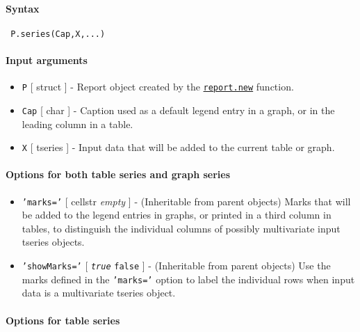


	\paragraph{Syntax}
 
 \begin{verbatim}
 P.series(Cap,X,...)
 \end{verbatim}
 
 \paragraph{Input arguments}
 
 \begin{itemize}
 \item
   \texttt{P} {[} struct {]} - Report object created by the
   \href{report/new}{\texttt{report.new}} function.
 \item
   \texttt{Cap} {[} char {]} - Caption used as a default legend entry in
   a graph, or in the leading column in a table.
 \item
   \texttt{X} {[} tseries {]} - Input data that will be added to the
   current table or graph.
 \end{itemize}
 
 \paragraph{Options for both table series and graph series}
 
 \begin{itemize}
 \item
   \texttt{'marks='} {[} cellstr \textbar{} \emph{empty} {]} -
   (Inheritable from parent objects) Marks that will be added to the
   legend entries in graphs, or printed in a third column in tables, to
   distinguish the individual columns of possibly multivariate input
   tseries objects.
 \item
   \texttt{'showMarks='} {[} \emph{\texttt{true}} \textbar{}
   \texttt{false} {]} - (Inheritable from parent objects) Use the marks
   defined in the \texttt{'marks='} option to label the individual rows
   when input data is a multivariate tseries object.
 \end{itemize}
 
 \paragraph{Options for table series}
 
